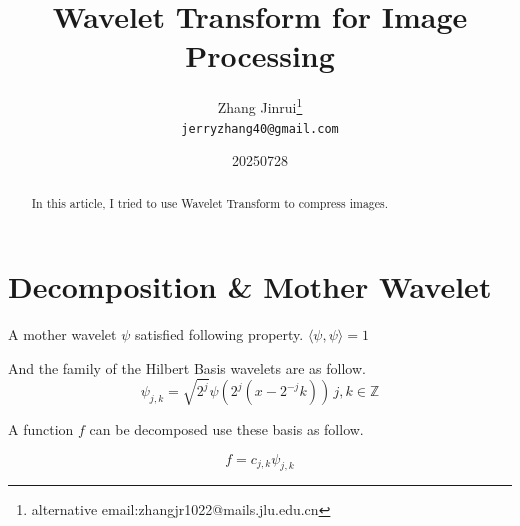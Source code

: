 \documentclass{article}
\title{Wavelet Transform for Image Processing}
\author{
Zhang Jinrui\thanks{alternative email:zhangjr1022@mails.jlu.edu.cn} \\ \texttt{jerryzhang40@gmail.com}
}
\date{20250728}  %
\theoremstyle{definition} %
\begin{document}
\maketitle

\begin{abstract}
    In this article, I tried to use
    Wavelet Transform to compress
    images\cite{raissi2017physics}.
\end{abstract}


\section{Decomposition \& Mother Wavelet}
A mother wavelet \(\psi\) satisfied
following property.
\(\langle\psi,\psi\rangle=1\)

And the family of the Hilbert Basis
wavelets are as follow.
\[
    \psi_{j,k}=\sqrt{2^j}\psi(2^j(x-2^{-j}k)) \, j,k\in \mathbb{Z}
\]

A function \(f\) can be decomposed
use these basis as follow.

\[
    f=c_{j,k}\psi_{j,k}
\]



\end{document}
